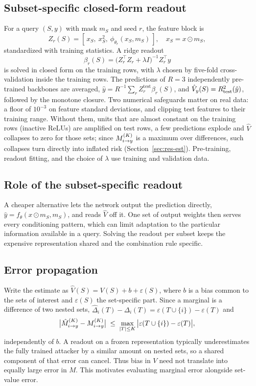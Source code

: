 \subsection{Subset-specific closed-form readout}
For a query $(S,y)$ with mask $m_S$ and seed $r$, the feature block is
\begin{equation}
Z_r(S)=[\,x_S,\ x_S^2,\ \phi_{\theta_r}(x_S,m_S)\,],\quad x_S=x\odot m_S,
\end{equation}
standardized with training statistics. A ridge readout
\begin{equation}\label{eq:ridge}
\beta_{r}(S) = \big(Z_r^{\top} Z_r + \lambda I\big)^{-1} Z_r^{\top} y
\end{equation}
is solved in closed form on the training rows, with $\lambda$ chosen by five-fold
cross-validation inside the training rows. The predictions of $R=3$ independently pre-trained
backbones are averaged, $\hat y = R^{-1}\sum_r Z_r^{\mathrm{test}}\beta_r(S)$, and
$\hat V_y(S)=R^2_{\mathrm{test}}(\hat y)$, followed by the monotone closure. Two numerical
safeguards matter on real data: a floor of $10^{-3}$ on feature standard deviations, and
clipping test features to their training range. Without them, units that are almost constant
on the training rows (inactive ReLUs) are amplified on test rows, a few predictions explode and
$\hat V$ collapses to zero for those sets; since $M^{(K)}_{i\to y}$ is a maximum over differences, such
collapses turn directly into inflated risk (Section~\ref{sec:res-est}). Pre-training, readout fitting, and the choice of $\lambda$ use training and validation data.

\subsection{Role of the subset-specific readout}
A cheaper alternative lets the network output the prediction directly, $\hat y=f_\theta(x\odot
m_S, m_S)$, and reads $\hat V$ off it. One set of output weights then serves every conditioning pattern, which can limit adaptation to the particular information available in a query. Solving the readout per subset
keeps the expensive representation shared and the combination rule specific.

\subsection{Error propagation}
Write the estimate as $\hat V(S)=V(S)+b+\varepsilon(S)$, where $b$ is a bias common to the sets
of interest and $\varepsilon(S)$ the set-specific part. Since a marginal is a difference of two
nested sets, $\hat\Delta_i(T)-\Delta_i(T)=\varepsilon(T\cup\{i\})-\varepsilon(T)$ and
\begin{equation}\label{eq:prop}
\big|\hat M^{(K)}_{i\to y} - M^{(K)}_{i\to y}\big| \;\le\; \max_{|T|\le K}\big|\varepsilon(T\cup\{i\})-\varepsilon(T)\big|,
\end{equation}
independently of $b$. A readout on a frozen representation typically underestimates the fully
trained attacker by a similar amount on nested sets, so a shared component of that error can cancel. Thus bias in $V$ need not translate into equally large error in $M$. This motivates evaluating marginal error alongside set-value error.

